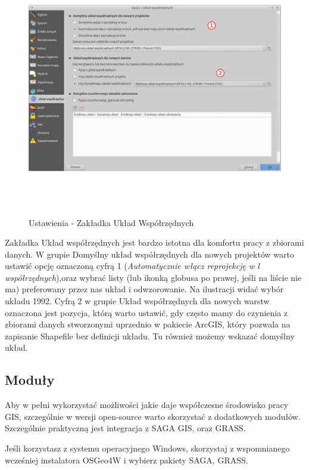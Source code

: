 \documentclass[12pt,a4paper]{book}
\begin{document}
\begin{center}
\begin{figure}
\includegraphics[width=16.997cm,height=11.19cm]{002-zakladka-uklad.jpg}
\caption{Ustawienia - Zakładka Układ Współrzędnych}
\end{figure}
\end{center}
Zakładka Układ współrzędnych jest bardzo istotna dla komfortu pracy z zbiorami danych. W grupie Domyślny układ współrzędnych dla nowych projektów warto ustawić opcję oznaczoną cyfrą 1 (\textit{Automatycznie włącz reprojekcję w l} \textit{współrzędnych}),oraz wybrać listy (lub ikonką globusa po prawej, jeśli na liście nie ma) preferowany przez nas układ i odwzorowanie. Na ilustracji widać wybór układu 1992. Cyfrą 2 w grupie Układ współrzędnych dla nowych warstw oznaczona jest pozycja, którą warto ustawić, gdy często mamy do czynienia z zbiorami danych stworzonymi uprzednio w pakiecie ArcGIS, który pozwala na zapisanie Shapefile bez definicji układu. Tu również możemy wskazać domyślny układ.

\subsection{Moduły}
Aby w pełni wykorzystać możliwości jakie daje współczesne środowisko pracy GIS, szczególnie w wersji open-source warto skorzystać z dodatkowych modułów. Szczególnie praktyczną jest integracja z SAGA GIS, oraz GRASS.

Jeśli korzystasz z systemu operacyjnego Windows, skorzystaj z wspomnianego wcześniej instalatora OSGeo4W i wybierz pakiety SAGA, GRASS.
\end{document}
